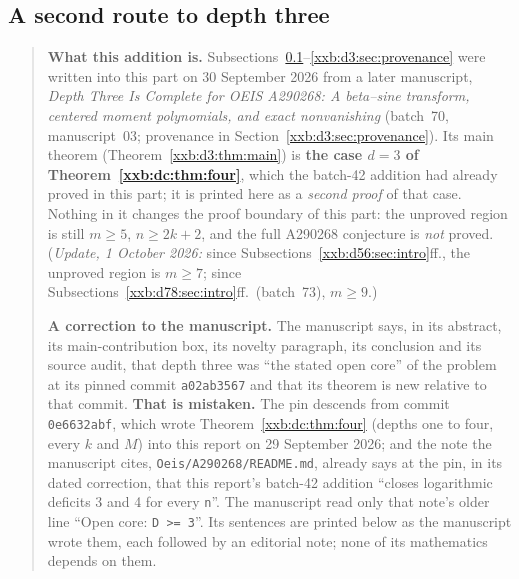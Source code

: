 \documentclass[11pt,a4paper]{article}
\numberwithin{equation}{section}
\theoremstyle{definition}
\theoremstyle{remark}
\theoremstyle{plain}
\begin{document}

\subsection{A second route to depth three}\label{xxb:d3:sec:intro}

\begin{quote}\small
\textbf{What this addition is.}  Subsections~\ref{xxb:d3:sec:intro}--\ref{xxb:d3:sec:provenance}
were written into this part on 30 September 2026 from a later manuscript,
\emph{Depth Three Is Complete for OEIS A290268: A beta--sine transform,
centered moment polynomials, and exact nonvanishing} (batch~70,
manuscript~03; provenance in Section~\ref{xxb:d3:sec:provenance}).  Its main
theorem (Theorem~\ref{xxb:d3:thm:main}) is \textbf{the case $d=3$ of
Theorem~\ref{xxb:dc:thm:four}}, which the batch-42 addition had already proved
in this part; it is printed here as a \emph{second proof} of that case.  Nothing
in it changes the proof boundary of this part: the unproved region is still
$m\ge5$, $n\ge2k+2$, and the full A290268 conjecture is \emph{not} proved.
(\emph{Update, 1 October 2026:} since
Subsections~\ref{xxb:d56:sec:intro}ff., the unproved region is $m\ge7$;
since Subsections~\ref{xxb:d78:sec:intro}ff.\ (batch~73), $m\ge9$.)

\smallskip
\textbf{A correction to the manuscript.}  The manuscript says, in its
abstract, its main-contribution box, its novelty paragraph, its conclusion and
its source audit, that depth three was ``the stated open core'' of the
problem at its pinned commit \texttt{a02ab3567} and that its theorem is new
relative to that commit.  \textbf{That is mistaken.}  The pin descends from
commit \texttt{0e6632abf}, which wrote Theorem~\ref{xxb:dc:thm:four} (depths
one to four, every $k$ and $M$) into this report on 29 September 2026; and
the note the manuscript cites, \texttt{Oeis/A290268/README.md}, already says
at the pin, in its dated correction, that this report's batch-42 addition
``closes logarithmic deficits 3 and 4 for every \texttt{n}''.  The manuscript
read only that note's older line ``Open core: \texttt{D >= 3}''.  Its
sentences are printed below as the manuscript wrote them, each followed by an
editorial note; none of its mathematics depends on them.


\end{quote}
\end{document}
